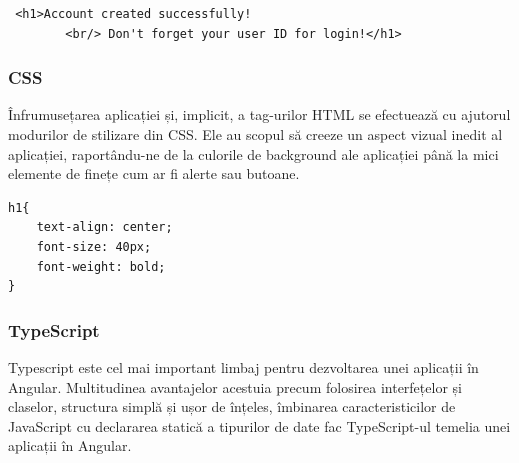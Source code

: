 \begin{center}
\begin{minipage}{0.8\textwidth}
\captionsetup{type=listing}
   \begin{lstlisting}
 <h1>Account created successfully!
        <br/> Don't forget your user ID for login!</h1>
\end{lstlisting} 
\end{minipage}
\end{center}

\vspace{0.5em}

\begin{minipage}{\textwidth}
\hfill
\begin{minipage}{0.9\textwidth}
\subsubsection{CSS}
\end{minipage}
\end{minipage}

\hspace{0cm} Înfrumusețarea aplicației și, implicit, a tag-urilor HTML se efectuează cu ajutorul modurilor de stilizare din CSS. Ele au scopul să creeze un aspect vizual inedit al aplicației, raportându-ne de la culorile de background ale aplicației până la mici elemente de finețe cum ar fi alerte sau butoane.

\begin{center}
\begin{minipage}{0.8\textwidth}
\captionsetup{type=listing}
   \begin{lstlisting}
h1{
    text-align: center;
    font-size: 40px;
    font-weight: bold;
}
\end{lstlisting} 
\end{minipage}
\end{center}

\vspace{0.5em}

\begin{minipage}{\textwidth}
\hfill
\begin{minipage}{0.9\textwidth}
\subsubsection{TypeScript}
\end{minipage}
\end{minipage}

\hspace{0cm} Typescript este cel mai important limbaj pentru dezvoltarea unei aplicații în Angular. Multitudinea avantajelor acestuia precum folosirea interfețelor și claselor, structura simplă și ușor de înțeles, îmbinarea caracteristicilor de JavaScript cu declararea statică a tipurilor de date fac TypeScript-ul temelia unei aplicații în Angular.

